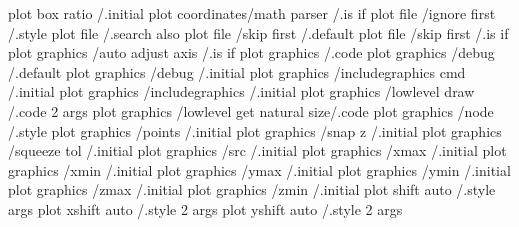 plot box ratio                            /.initial                 
plot coordinates/math parser              /.is if
plot file       /ignore first             /.style
plot file                                 /.search also             
plot file       /skip first               /.default
plot file       /skip first               /.is if
plot graphics   /auto adjust axis         /.is if
plot graphics                             /.code                    
plot graphics   /debug                    /.default
plot graphics   /debug                    /.initial
plot graphics   /includegraphics cmd      /.initial
plot graphics   /includegraphics          /.initial
plot graphics   /lowlevel draw            /.code 2 args
plot graphics   /lowlevel get natural size/.code
plot graphics   /node                     /.style
plot graphics   /points                   /.initial
plot graphics   /snap z                   /.initial
plot graphics   /squeeze tol              /.initial
plot graphics   /src                      /.initial
plot graphics   /xmax                     /.initial
plot graphics   /xmin                     /.initial
plot graphics   /ymax                     /.initial
plot graphics   /ymin                     /.initial
plot graphics   /zmax                     /.initial
plot graphics   /zmin                     /.initial
plot shift auto                           /.style args              
plot xshift auto                          /.style 2 args            
plot yshift auto                          /.style 2 args            

